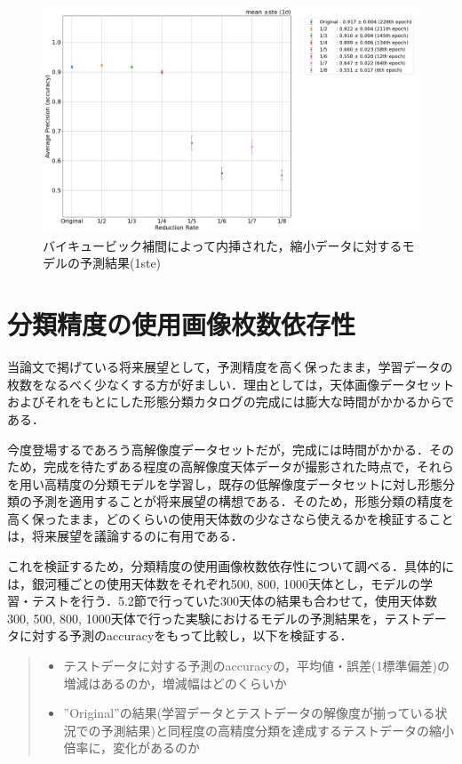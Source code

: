 \documentclass[a4j, 11pt]{jreport}
\begin{document}
\begin{figure}[H]
  \centering
  \includegraphics[width=16cm]{images/5syou/print_errorbar/cubic/acc_with_errorbar_syuron5_cubic_900epoch_30run_300_acc_max_ste1sigma.png}
  \caption{バイキュービック補間によって内挿された，縮小データに対するモデルの予測結果(1ste)}
  \label{fig:cubic_300_1ste}
\end{figure}



\newpage
\section{分類精度の使用画像枚数依存性}
当論文で掲げている将来展望として，予測精度を高く保ったまま，学習データの枚数をなるべく少なくする方が好ましい．理由としては，天体画像データセットおよびそれをもとにした形態分類カタログの完成には膨大な時間がかかるからである．

今度登場するであろう高解像度データセットだが，完成には時間がかかる．そのため，完成を待たずある程度の高解像度天体データが撮影された時点で，それらを用い高精度の分類モデルを学習し，既存の低解像度データセットに対し形態分類の予測を適用することが将来展望の構想である．そのため，形態分類の精度を高く保ったまま，どのくらいの使用天体数の少なさなら使えるかを検証することは，将来展望を議論するのに有用である．

これを検証するため，分類精度の使用画像枚数依存性について調べる．具体的には，銀河種ごとの使用天体数をそれぞれ500, 800, 1000天体とし，モデルの学習・テストを行う．5.2節で行っていた300天体の結果も合わせて，使用天体数300, 500, 800, 1000天体で行った実験におけるモデルの予測結果を，テストデータに対する予測のaccuracyをもって比較し，以下を検証する．
\begin{quote}
 \begin{itemize}
  \item テストデータに対する予測のaccuracyの，平均値・誤差(1標準偏差)の増減はあるのか，増減幅はどのくらいか
  \item ''Original''の結果(学習データとテストデータの解像度が揃っている状況での予測結果)と同程度の高精度分類を達成するテストデータの縮小倍率に，変化があるのか
 \end{itemize}
\end{quote}
\end{document}
